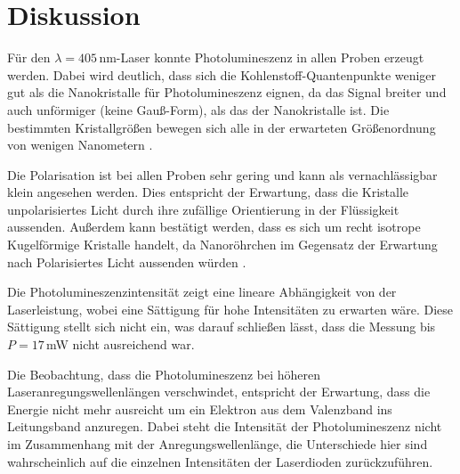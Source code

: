 \newpage
\section{Diskussion}
\label{sec:conclusion}

Für den $\lambda=405\,\si{\nano\meter}$-Laser konnte Photolumineszenz in allen Proben erzeugt werden.
Dabei wird deutlich, dass sich die Kohlenstoff-Quantenpunkte weniger gut als die Nanokristalle für Photolumineszenz eignen, da das Signal breiter und auch unförmiger (keine Gauß-Form), als das der Nanokristalle ist.
Die bestimmten Kristallgrößen bewegen sich alle in der erwarteten Größenordnung von wenigen Nanometern \cite{anleitung}.

Die Polarisation ist bei allen Proben sehr gering und kann als vernachlässigbar klein angesehen werden.
Dies entspricht der Erwartung, dass die Kristalle unpolarisiertes Licht durch ihre zufällige Orientierung in der Flüssigkeit aussenden.
Außerdem kann bestätigt werden, dass es sich um recht isotrope Kugelförmige Kristalle handelt, da Nanoröhrchen im Gegensatz der Erwartung nach Polarisiertes Licht 
aussenden würden \cite{Rods}.

Die Photolumineszenzintensität zeigt eine lineare Abhängigkeit von der Laserleistung,
wobei eine Sättigung für hohe Intensitäten zu erwarten wäre.
Diese Sättigung stellt sich nicht ein, was darauf schließen lässt, dass die Messung bis $P=17\,$mW nicht ausreichend war.

Die Beobachtung, dass die Photolumineszenz bei höheren Laseranregungswellenlängen 
verschwindet, entspricht der Erwartung, dass die Energie nicht mehr ausreicht um ein Elektron aus dem Valenzband ins Leitungsband anzuregen.
Dabei steht die Intensität der Photolumineszenz nicht im Zusammenhang mit der Anregungswellenlänge, die Unterschiede hier 
sind wahrscheinlich auf die einzelnen Intensitäten der Laserdioden zurückzuführen.
